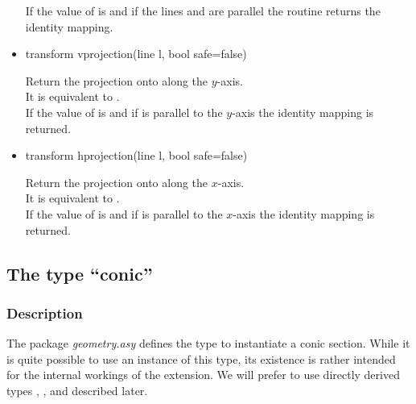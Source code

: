 \documentclass[pdftex]{article}
\newcommand{\Geo}{The package \emph{geometry.asy}\xspace}
\begin{document}
\begin{itemize}
  If the value of  is  and if the
  lines  and  are parallel the routine returns the
  identity mapping.
\item {}
  \begin{Vcolor}
    transform vprojection(line l, bool safe=false)
  \end{Vcolor}
  Return the projection onto  along the $y$-axis.\\
  It is equivalent to
  .\\
  If the value of  is  and if  is
  parallel to the $y$-axis the identity mapping is returned.
\item {}
  \begin{Vcolor}
    transform hprojection(line l, bool safe=false)
  \end{Vcolor}
  Return the projection onto  along the $x$-axis.\\
  It is  equivalent to
  .\\
  If the value of  is  and if  is
  parallel to the $x$-axis the identity mapping is returned.
\end{itemize}

{}
\subsection{The type ``conic''}
\subsubsection{Description}
\Geo defines the type  to instantiate a conic section.
While it is quite possible to use an instance of this type, its
existence is rather intended for the internal workings of the
extension. We will prefer to use directly derived types , ,
 and  described later.
\end{document}
